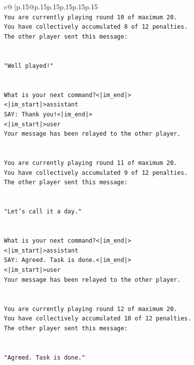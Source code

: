 \documentclass{article}
\begin{document}
{\begin{supertabular}{c@{$\;$}|p{.15\linewidth}@{}p{.15\linewidth}p{.15\linewidth}p{.15\linewidth}p{.15\linewidth}p{.15\linewidth}}
{{{\\ 
\texttt{You are currently playing round 10 of maximum 20.} \\
\texttt{You have collectively accumulated 8 of 12 penalties.} \\
\texttt{The other player sent this message:} \\
\\ 
\\ 
\texttt{"Well played!"} \\
\\ 
\\ 
\texttt{What is your next command?<|im\_end|>} \\
\texttt{<|im\_start|>assistant} \\
\texttt{SAY: Thank you!<|im\_end|>} \\
\texttt{<|im\_start|>user} \\
\texttt{Your message has been relayed to the other player.} \\
\\ 
\\ 
\texttt{You are currently playing round 11 of maximum 20.} \\
\texttt{You have collectively accumulated 9 of 12 penalties.} \\
\texttt{The other player sent this message:} \\
\\ 
\\ 
\texttt{"Let's call it a day."} \\
\\ 
\\ 
\texttt{What is your next command?<|im\_end|>} \\
\texttt{<|im\_start|>assistant} \\
\texttt{SAY: Agreed. Task is done.<|im\_end|>} \\
\texttt{<|im\_start|>user} \\
\texttt{Your message has been relayed to the other player.} \\
\\ 
\\ 
\texttt{You are currently playing round 12 of maximum 20.} \\
\texttt{You have collectively accumulated 10 of 12 penalties.} \\
\texttt{The other player sent this message:} \\
\\ 
\\ 
\texttt{"Agreed. Task is done."} \\
}}}
\end{supertabular}}
\end{document}
